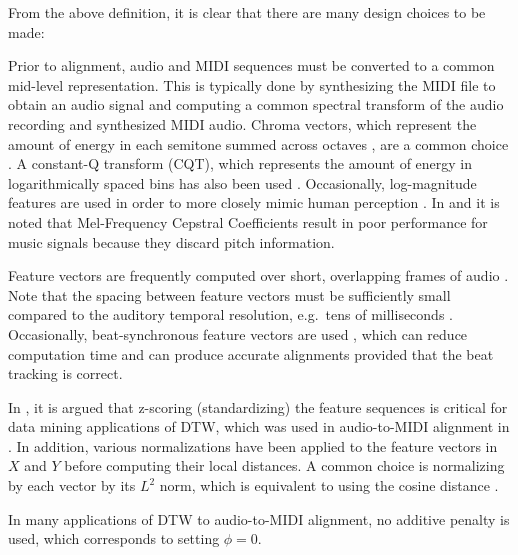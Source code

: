 \documentclass{article}
\begin{document}
From the above definition, it is clear that there are many design choices to be made:
\begin{description}[topsep=1pt,itemsep=-1pt,leftmargin=5pt]
\item[Feature representation ($X$ and $Y$):] Prior to alignment, audio and MIDI sequences must be converted to a common mid-level representation.
This is typically done by synthesizing the MIDI file to obtain an audio signal and computing a common spectral transform of the audio recording and synthesized MIDI audio.
Chroma vectors, which represent the amount of energy in each semitone summed across octaves \cite{fujishima1999realtime}, are a common choice \cite{hu2003polyphonic, ewert2012towards}.
A constant-Q transform (CQT), which represents the amount of energy in logarithmically spaced bins \cite{brown1991calculation} has also been used \cite{raffel2015large, dixon2005match, ellis2013aligning}.
Occasionally, log-magnitude features are used in order to more closely mimic human perception \cite{raffel2015large, ellis2013aligning, turetsky2003ground}.
In \cite{turetsky2003ground} and \cite{hu2003polyphonic} it is noted that Mel-Frequency Cepstral Coefficients result in poor performance for music signals because they discard pitch information.
\item[Time scale ($t_X$ and $t_Y$):] Feature vectors are frequently computed over short, overlapping frames of audio \cite{dixon2005match, turetsky2003ground, hu2003polyphonic}.
Note that the spacing between feature vectors must be sufficiently small compared to the auditory temporal resolution, e.g.\ tens of milliseconds \cite{blauert1997spatial}.
Occasionally, beat-synchronous feature vectors are used \cite{raffel2015large,ellis2013aligning}, which can reduce computation time and can produce accurate alignments provided that the beat tracking is correct.
\item[Normalization:] In \cite{rakthanmanon2012searching}, it is argued that z-scoring (standardizing) the feature sequences is critical for data mining applications of DTW, which was used in audio-to-MIDI alignment in \cite{hu2003polyphonic}.
In addition, various normalizations have been applied to the feature vectors in $X$ and $Y$ before computing their local distances.
A common choice is normalizing by each vector by its $L^2$ norm, which is equivalent to using the cosine distance \cite{turetsky2003ground, ewert2012towards, raffel2015large, ellis2013aligning}.
\item[Penalty ($\phi$):] In many applications of DTW to audio-to-MIDI alignment, no additive penalty is used, which corresponds to setting $\phi = 0$.

\end{description}
\end{document}
